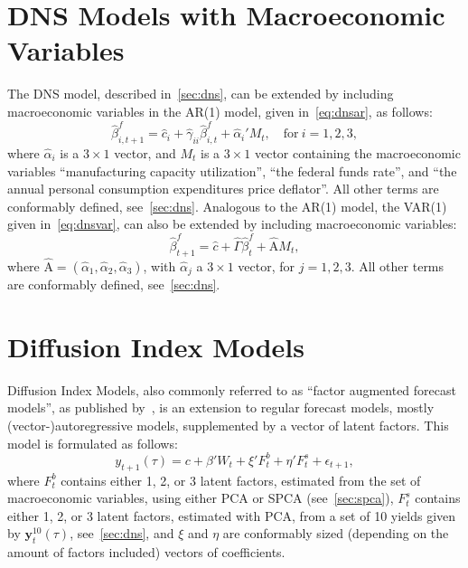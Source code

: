 \section{DNS Models with Macroeconomic Variables}
\label{sec:dnsmv}
The DNS model, described in~\cref{sec:dns}, can be extended by including macroeconomic variables in the AR(1) model, given in~\cref{eq:dnsar}, as follows:
\begin{equation}
	\hat{\beta}_{i,t+1}^{f} = \hat{c}_i + \hat{\gamma}_{ii} \hat{\beta}_{i,t}^f + \hat{\alpha}_i' M_t, \quad \text{for}~i = 1,2,3,
\end{equation}
where $\hat{\alpha}_i$ is a $3 \times 1$ vector, and $M_t$ is a $3 \times 1$ vector containing the macroeconomic variables \enquote{manufacturing capacity utilization}, \enquote{the federal funds rate}, and \enquote{the annual personal consumption expenditures price deflator}. 
All other terms are conformably defined, see~\cref{sec:dns}. 
Analogous to the AR(1) model, the VAR(1) given in~\cref{eq:dnsvar}, can also be extended by including macroeconomic variables:
\begin{equation}
	\hat{\beta}_{t+1}^{f} = \hat{c} + \hat{\Gamma} \hat{\beta}_t^f + \hat{\mathrm{A}} M_t,
\end{equation}
where $\hat{\mathrm{A}} = \left(\hat{\alpha}_1, \hat{\alpha}_2, \hat{\alpha}_3 \right)$, with $\hat{\alpha}_j$ a $3 \times 1$ vector, for $j = 1,2,3$. 
All other terms are conformably defined, see~\cref{sec:dns}.

\section{Diffusion Index Models}
\label{sec:dif}
Diffusion Index Models, also commonly referred to as \enquote{factor augmented forecast models}, as published by~\textcite[hereafter DIF]{Stock2002a,Stock2002b}, is an extension to regular forecast models, mostly (vector-)autoregressive models, supplemented by a vector of latent factors. 
This model is formulated as follows:
\begin{equation}
	y_{t+1}(\tau) = c + \beta' W_t + \xi' F_t^b + \eta' F_t^s + \epsilon_{t+1},
\end{equation}
where $F_t^b$ contains either 1, 2, or 3 latent factors, estimated from the set of macroeconomic variables, using either PCA or SPCA (see~\cref{sec:spca}), $F_t^s$ contains either 1, 2, or 3 latent factors, estimated with PCA, from a set of 10 yields given by $\mathbf{y}_t^{10}(\tau)$, see~\cref{sec:dns}, and $\xi$ and $\eta$ are conformably sized (depending on the amount of factors included) vectors of coefficients. 

